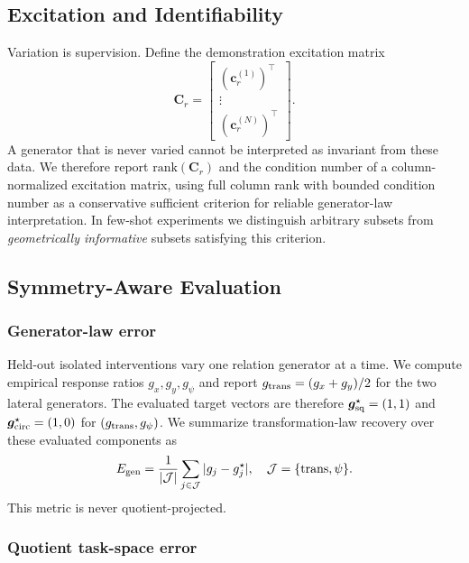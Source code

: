 \documentclass[letterpaper,10pt,conference]{ieeeconf}
\begin{document}
\subsection{Excitation and Identifiability}

Variation is supervision. Define the demonstration excitation matrix
\begin{equation}
    \mathbf C_r=
    \begin{bmatrix}
    (\bm c_r^{(1)})^\top\\[-1mm]
    \vdots\\
    (\bm c_r^{(N)})^\top
    \end{bmatrix}.
\end{equation}
A generator that is never varied cannot be interpreted as invariant from these
data. We therefore report $\mathrm{rank}(\mathbf C_r)$ and the condition number
of a column-normalized excitation matrix, using full column rank with bounded
condition number as a conservative sufficient criterion for reliable
generator-law interpretation. In few-shot experiments we distinguish arbitrary
subsets from \emph{geometrically informative} subsets satisfying this criterion.

\subsection{Symmetry-Aware Evaluation}
\label{sec:evaluation}

\subsubsection{Generator-law error}

Held-out isolated interventions vary one relation generator at a time.
We compute empirical response ratios $g_x,g_y,g_\psi$ and report
$g_{\rm trans}=(g_x+g_y)/2$ for the two lateral generators. The evaluated
target vectors are therefore $\bm g_{\rm sq}^{\star}=(1,1)$ and
$\bm g_{\rm circ}^{\star}=(1,0)$ for $(g_{\rm trans},g_\psi)$. We summarize
transformation-law recovery over these evaluated components as
\begin{equation}
    E_{\rm gen}
    =
    \frac{1}{|\mathcal J|}
    \sum_{j\in\mathcal J}
    |g_j-g_j^{\star}|,\quad
    \mathcal J=\{\mathrm{trans},\psi\}.
    \label{eq:egen}
\end{equation}
This metric is never quotient-projected.

\subsubsection{Quotient task-space error}
\end{document}
